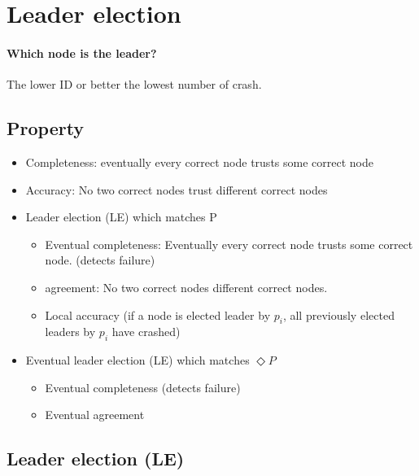 \section{Leader election}

\paragraph{Which node is the leader?}
The lower ID or better the lowest number of crash.

\subsection{Property}
\begin{itemize}
            \item Completeness: eventually every correct node trusts
            some correct node
            \item Accuracy: No two correct nodes trust different correct nodes
        \end{itemize}

\begin{itemize}
    \item Leader election (LE) which matches P
        \begin{itemize}
            \item Eventual completeness: Eventually every correct
            node trusts some correct node. (detects failure)
            \item agreement: No two correct nodes different correct
            nodes.
            \item Local accuracy (if a node is elected leader by $p_i$,
            all previously elected leaders by $p_i$ have crashed)
        \end{itemize}
    \item Eventual leader election (LE) which matches $\Diamond P$
        \begin{itemize}
            \item Eventual completeness (detects failure)
            \item Eventual agreement
        \end{itemize}

\end{itemize}

\subsection{Leader election (LE)}

